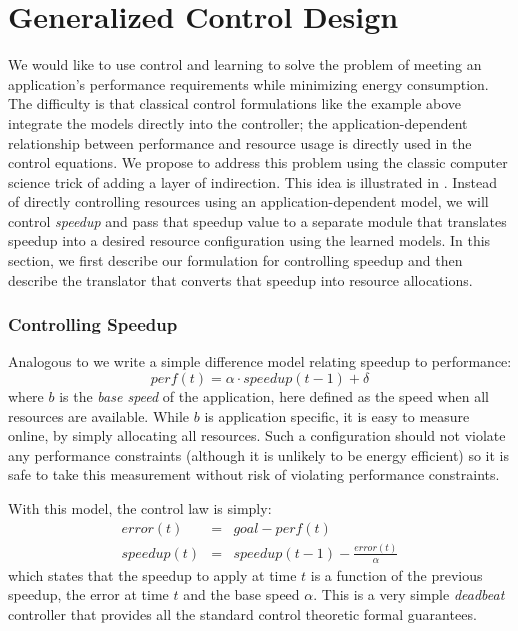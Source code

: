 \section{Generalized Control Design}
We would like to use control and learning to solve the problem of
meeting an application's performance requirements while minimizing
energy consumption.  The difficulty is that classical control
formulations like the example above integrate the models directly into
the controller; \ie the application-dependent relationship between
performance and resource usage is directly used in the control
equations.  We propose to address this problem using the classic
computer science trick of adding a layer of indirection.  This idea is
illustrated in .  Instead of directly controlling
resources using an application-dependent model, we will control
\emph{speedup} and pass that speedup value to a separate module that
translates speedup into a desired resource configuration using the
learned models.  In this section, we first describe our formulation
for controlling speedup and then describe the translator that converts
that speedup into resource allocations.

\subsubsection{Controlling Speedup}
Analogous to  we write a simple difference model
relating speedup to performance:
\begin{equation}
  perf(t) = \alpha \cdot speedup(t-1) + \delta \label{eqn:speedup}
\end{equation}
where $b$ is the \emph{base speed} of the application, here defined as
the speed when all resources are available.  While $b$ is application
specific, it is easy to measure online, by simply allocating all
resources. Such a configuration should not violate any performance
constraints (although it is unlikely to be energy efficient) so it is
safe to take this measurement without risk of violating performance
constraints.

With this model, the control law is simply:
\begin{eqnarray}
  error(t) &=& goal - perf(t) \label{eqn:speedup-error} \\
  speedup(t) &=& speedup(t-1) - \frac{error(t)}{\alpha}
  \label{eqn:speedup-control}
\end{eqnarray}
which states that the speedup to apply at time $t$ is a function of
the previous speedup, the error at time $t$ and the base speed $\alpha$.
This is a very simple \emph{deadbeat}  controller that provides
all the standard control theoretic formal guarantees.

